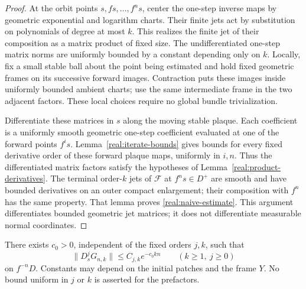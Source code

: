 \begin{proof}
At the orbit points $s,f s,\ldots,f^ns$, center the one-step inverse
maps by geometric exponential and logarithm charts. Their finite
jets act by substitution on polynomials of degree at most $k$.
This realizes the finite jet of their composition as a matrix
product of fixed size. The undifferentiated one-step matrix norms
are uniformly bounded by a constant depending only on $k$.
Locally, fix a small stable ball about the point being estimated and
hold fixed geometric frames on its successive forward images.
Contraction puts these images inside uniformly bounded ambient charts;
use the same intermediate frame in the two adjacent factors.
These local choices require no global bundle trivialization.

Differentiate these matrices in $s$ along the moving stable plaque.
Each coefficient is a uniformly smooth geometric one-step
coefficient evaluated at one of the forward points $f^i s$.
Lemma~\ref{real:iterate-bounds} gives bounds for every fixed
derivative order of these forward plaque maps, uniformly in $i,n$.
Thus the differentiated matrix factors satisfy the hypotheses of
Lemma~\ref{real:product-derivatives}. The terminal order-$k$ jets of
$\mathcal F$ at $f^ns\in D^+$ are smooth and have bounded
derivatives on an outer compact enlargement; their composition
with $f^n$ has the same property. That lemma proves
\eqref{real:naive-estimate}. This argument differentiates bounded
geometric jet matrices; it does not differentiate measurable normal
coordinates.
\end{proof}

\begin{proposition}\label{real:decay}
There exists $c_0>0$, independent of the fixed orders $j,k$, such
that
\begin{equation}\label{real:decay-estimate}
 \|D_s^jG_{n,k}\|\le C_{j,k}e^{-c_0kn}
 \qquad(k\ge1,\ j\ge0)
\end{equation}
on $f^{-n}D$. Constants may depend on the initial patches and the
frame $Y$. No bound uniform in $j$ or $k$ is asserted for the
prefactors.
\end{proposition}

